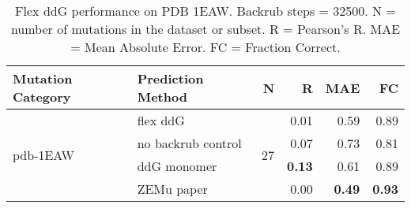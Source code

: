 \begin{table}
  \begin{tabular}{llrrrr}
\toprule
Mutation Category &   Prediction Method &   N &    R &  MAE &   FC \\
\midrule
 \multirow{ 4}{*}{pdb-1EAW} & flex ddG & \multirow{ 4}{*}{27} & 0.01 & 0.59 & 0.89  \\
 & no backrub control & & 0.07 & 0.73 & 0.81  \\
 & ddG monomer & & \textbf{0.13} & 0.61 & 0.89  \\
 & ZEMu paper & & 0.00 & \textbf{0.49} & \textbf{0.93}  \\
\bottomrule
\end{tabular}
  \caption[Flex ddG performance on PDB 1EAW]{
    Flex ddG performance on PDB 1EAW. Backrub steps = 32500. N = number of mutations in the dataset or subset. R = Pearson's R. MAE = Mean Absolute Error. FC = Fraction Correct.
  } \label{tab:table-pdb-1EAW}
\end{table}

